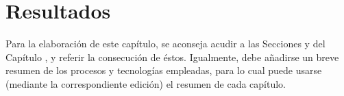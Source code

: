\section{\forlnameref Resultados}
\label{sec:results}

\begin{shaded}
Para la elaboración de este capítulo, se aconseja acudir a las Secciones  y  del Capítulo , y referir la consecución de éstos. Igualmente, debe añadirse un breve resumen de los procesos y tecnologías empleadas, para lo cual puede usarse (mediante la correspondiente edición) el resumen de cada capítulo.
\end{shaded}